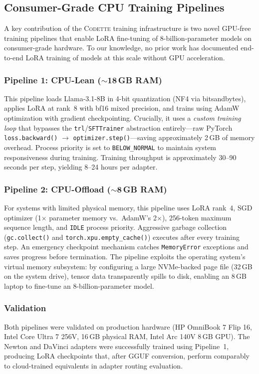 \documentclass[11pt,a4paper]{article}
\newcommand{\codette}{\textsc{Codette}}
\begin{document}
\subsection{Consumer-Grade CPU Training Pipelines}
\label{sec:cpu_pipelines}

A key contribution of the \codette{} training infrastructure is two novel GPU-free training pipelines that enable LoRA fine-tuning of 8-billion-parameter models on consumer-grade hardware. To our knowledge, no prior work has documented end-to-end LoRA training of models at this scale without GPU acceleration.

\subsubsection{Pipeline 1: CPU-Lean (${\sim}$18\,GB RAM)}
This pipeline loads Llama-3.1-8B in 4-bit quantization (NF4 via bitsandbytes), applies LoRA at rank~8 with bf16 mixed precision, and trains using AdamW optimization with gradient checkpointing. Crucially, it uses a \emph{custom training loop} that bypasses the \texttt{trl}/\texttt{SFTTrainer} abstraction entirely---raw PyTorch \texttt{loss.backward()} $\to$ \texttt{optimizer.step()}---saving approximately 2\,GB of memory overhead. Process priority is set to \texttt{BELOW\_NORMAL} to maintain system responsiveness during training. Training throughput is approximately 30--90 seconds per step, yielding 8--24 hours per adapter.

\subsubsection{Pipeline 2: CPU-Offload (${\sim}$8\,GB RAM)}
For systems with limited physical memory, this pipeline uses LoRA rank~4, SGD optimizer (1$\times$ parameter memory vs.\ AdamW's 2$\times$), 256-token maximum sequence length, and \texttt{IDLE} process priority. Aggressive garbage collection (\texttt{gc.collect()} and \texttt{torch.xpu.empty\_cache()}) executes after every training step. An emergency checkpoint mechanism catches \texttt{MemoryError} exceptions and saves progress before termination. The pipeline exploits the operating system's virtual memory subsystem: by configuring a large NVMe-backed page file (32\,GB on the system drive), tensor data transparently spills to disk, enabling an 8\,GB laptop to fine-tune an 8-billion-parameter model.

\subsubsection{Validation}
Both pipelines were validated on production hardware (HP OmniBook 7 Flip 16, Intel Core Ultra 7 256V, 16\,GB physical RAM, Intel Arc 140V 8\,GB GPU). The Newton and DaVinci adapters were successfully trained using Pipeline~1, producing LoRA checkpoints that, after GGUF conversion, perform comparably to cloud-trained equivalents in adapter routing evaluation.
\end{document}

